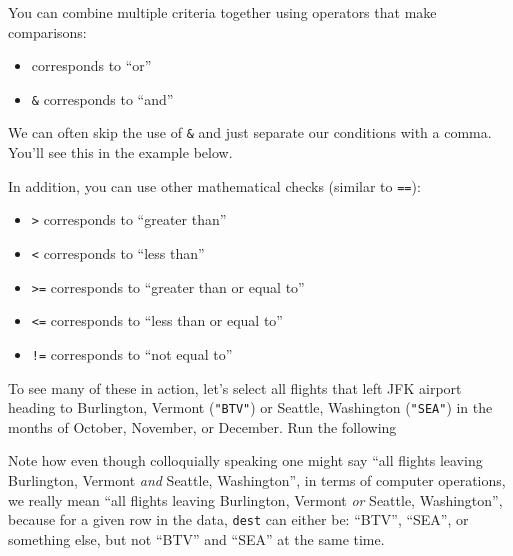 \documentclass[]{tufte-book}
\newenvironment{Shaded}{\begin{snugshade}}{\end{snugshade}}
\newcommand{\KeywordTok}[1]{\textcolor[rgb]{0.13,0.29,0.53}{\textbf{{#1}}}}
\newcommand{\DecValTok}[1]{\textcolor[rgb]{0.00,0.00,0.81}{{#1}}}
\newcommand{\StringTok}[1]{\textcolor[rgb]{0.31,0.60,0.02}{{#1}}}
\newcommand{\NormalTok}[1]{{#1}}
\providecommand{\tightlist}{%
  \setlength{\itemsep}{0pt}\setlength{\parskip}{0pt}}
\theoremstyle{definition}
\theoremstyle{definition}
\theoremstyle{remark}
\begin{document}
You can combine multiple criteria together using operators that make
comparisons:

\begin{itemize}
\tightlist
\item
  \texttt{\textbar{}} corresponds to ``or''
\item
  \texttt{\&} corresponds to ``and''
\end{itemize}

We can often skip the use of \texttt{\&} and just separate our
conditions with a comma. You'll see this in the example below.

In addition, you can use other mathematical checks (similar to
\texttt{==}):

\begin{itemize}
\tightlist
\item
  \texttt{\textgreater{}} corresponds to ``greater than''
\item
  \texttt{\textless{}} corresponds to ``less than''
\item
  \texttt{\textgreater{}=} corresponds to ``greater than or equal to''
\item
  \texttt{\textless{}=} corresponds to ``less than or equal to''
\item
  \texttt{!=} corresponds to ``not equal to''
\end{itemize}

To see many of these in action, let's select all flights that left JFK
airport heading to Burlington, Vermont (\texttt{"BTV"}) or Seattle,
Washington (\texttt{"SEA"}) in the months of October, November, or
December. Run the following

\begin{Shaded}
\end{Shaded}

Note how even though colloquially speaking one might say ``all flights
leaving Burlington, Vermont \emph{and} Seattle, Washington'', in terms
of computer operations, we really mean ``all flights leaving Burlington,
Vermont \emph{or} Seattle, Washington'', because for a given row in the
data, \texttt{dest} can either be: ``BTV'', ``SEA'', or something else,
but not ``BTV'' and ``SEA'' at the same time.
\end{document}
